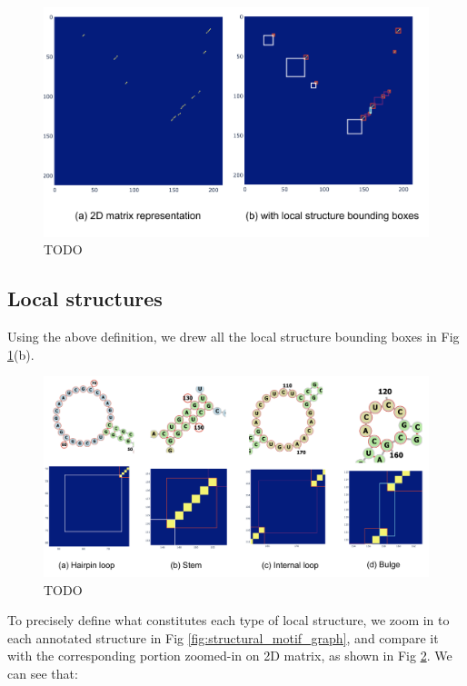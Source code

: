 \documentclass[12pt]{article}
\begin{document}
\begin{figure}[h]
    \centering
    \includegraphics[width=\textwidth]{plot/structural_motif_2d_matrix.png}
    \caption{TODO}
    \label{fig:structural_motif_2d_matrix}
    \centering
\end{figure}


\subsection{Local structures}


Using the above definition, we drew all the local structure bounding boxes
in Fig \ref{fig:structural_motif_2d_matrix}(b).


\begin{figure}[h]
    \centering
    \includegraphics[width=\textwidth]{plot/local_bounding_box_examples.png}
    \caption{TODO}
    \label{fig:local_bounding_box_examples}
    \centering
\end{figure}


To precisely define what constitutes each type of local structure,
we zoom in to each annotated structure in Fig \ref{fig:structural_motif_graph},
and compare it with the corresponding portion zoomed-in on 2D matrix, as shown in
Fig \ref{fig:local_bounding_box_examples}.
We can see that:
\end{document}
